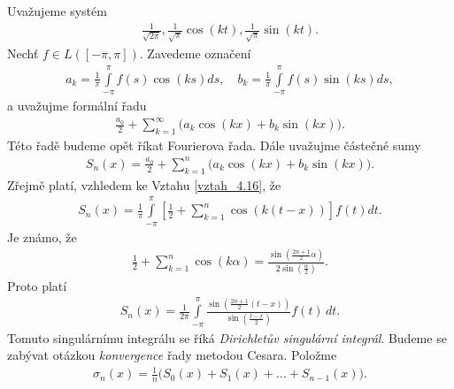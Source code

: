 Uvažujeme systém
\begin{align*}
\frac{1}{\sqrt{2\pi}}, \frac{1}{\sqrt{\pi}} \cos(kt), \frac{1}{\sqrt{\pi}} \sin(kt).
\end{align*}
Nechť $f \in L([-\pi, \pi])$. Zavedeme označení
\begin{align}\label{vztah_4.16}
a_k = \frac{1}{\pi} \int \limits_{-\pi}^\pi f(s) \cos(ks) ds, \quad b_k = \frac{1}{\pi} \int \limits_{-\pi}^\pi f(s) \sin(ks) ds,
\end{align}
a uvažujme formální řadu
\begin{align*}
\frac{a_0}{2} + \sum \limits _{k=1}^{\infty} \Big( a_k \cos(kx) + b_k \sin(kx) \Big).
\end{align*}
Této řadě budeme opět říkat Fourierova řada. Dále uvažujme částečné sumy
\begin{align*}
S_n(x) = \frac{a_0}{2} + \sum \limits _{k=1}^n \Big( a_k \cos(kx) + b_k \sin (kx) \Big).
\end{align*}
Zřejmě platí, vzhledem ke Vztahu \eqref{vztah_4.16}, že
\begin{align*}
S_n(x) = \frac{1}{\pi} \int \limits_{-\pi}^\pi \left[ \frac{1}{2} + \sum \limits _{k=1}^n \cos(k(t-x)) \right] f(t) dt.
\end{align*}
Je známo, že
\begin{align*}
\frac{1}{2} + \sum \limits _{k=1}^n \cos(k \alpha) = \frac{\sin \left( \frac{2n+1}{2}\alpha \right)}{2 \sin \left( \frac{\alpha}{2} \right)}.
\end{align*}
Proto platí
\begin{align}\label{vztah_4.17}
S_n(x) = \frac{1}{2\pi} \int \limits_{-\pi}^\pi \frac{\sin \left(\frac{2n+1}{2}(t-x) \right)}{\sin \left( \frac{t-x}{2} \right)} f(t) \, dt.
\end{align}
Tomuto singulárnímu integrálu se říká \textit{Dirichletův singulární integrál}. Budeme se zabývat otázkou \textit{konvergence} řady metodou Cesara. Položme
\begin{align*}
\sigma_n (x) = \frac{1}{n} \Big( S_0(x) + S_1(x) + \ldots + S_{n-1}(x)\Big).
\end{align*}
